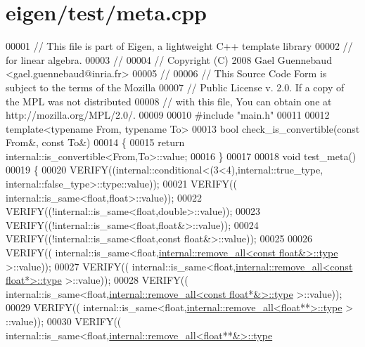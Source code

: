 \hypertarget{eigen_2test_2meta_8cpp_source}{}\section{eigen/test/meta.cpp}
\label{eigen_2test_2meta_8cpp_source}

\begin{DoxyCode}
00001 \textcolor{comment}{// This file is part of Eigen, a lightweight C++ template library}
00002 \textcolor{comment}{// for linear algebra.}
00003 \textcolor{comment}{//}
00004 \textcolor{comment}{// Copyright (C) 2008 Gael Guennebaud <gael.guennebaud@inria.fr>}
00005 \textcolor{comment}{//}
00006 \textcolor{comment}{// This Source Code Form is subject to the terms of the Mozilla}
00007 \textcolor{comment}{// Public License v. 2.0. If a copy of the MPL was not distributed}
00008 \textcolor{comment}{// with this file, You can obtain one at http://mozilla.org/MPL/2.0/.}
00009 
00010 \textcolor{preprocessor}{#include "main.h"}
00011 
00012 \textcolor{keyword}{template}<\textcolor{keyword}{typename} From, \textcolor{keyword}{typename} To>
00013 \textcolor{keywordtype}{bool} check\_is\_convertible(\textcolor{keyword}{const} From&, \textcolor{keyword}{const} To&)
00014 \{
00015   \textcolor{keywordflow}{return} internal::is\_convertible<From,To>::value;
00016 \}
00017 
00018 \textcolor{keywordtype}{void} test\_meta()
00019 \{
00020   VERIFY((internal::conditional<(3<4),internal::true\_type, internal::false\_type>::type::value));
00021   VERIFY(( internal::is\_same<float,float>::value));
00022   VERIFY((!internal::is\_same<float,double>::value));
00023   VERIFY((!internal::is\_same<float,float&>::value));
00024   VERIFY((!internal::is\_same<float,const float&>::value));
00025   
00026   VERIFY(( internal::is\_same<\textcolor{keywordtype}{float},\hyperlink{group___sparse_core___module}{internal::remove\_all<const float&>::type}
       >::value));
00027   VERIFY(( internal::is\_same<\textcolor{keywordtype}{float},\hyperlink{group___sparse_core___module}{internal::remove\_all<const float*>::type}
       >::value));
00028   VERIFY(( internal::is\_same<\textcolor{keywordtype}{float},\hyperlink{group___sparse_core___module}{internal::remove\_all<const float*&>::type}
       >::value));
00029   VERIFY(( internal::is\_same<\textcolor{keywordtype}{float},\hyperlink{group___sparse_core___module}{internal::remove\_all<float**>::type} >
      ::value));
00030   VERIFY(( internal::is\_same<\textcolor{keywordtype}{float},\hyperlink{group___sparse_core___module}{internal::remove\_all<float**&>::type}

\end{DoxyCode}
